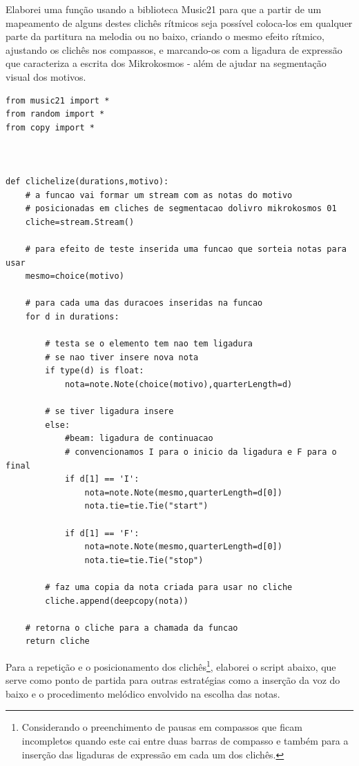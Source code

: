 \documentclass[
	12pt,				%
	openright,			%
	twoside,			%
	a4paper,			%
	english,			%
	french,				%
	spanish,			%
	brazil				%
	]{abntex2}
\begin{document}
Elaborei uma função usando a biblioteca Music21 para que a partir de um mapeamento de alguns destes clichês rítmicos seja possível coloca-los em qualquer parte da partitura na melodia ou no baixo, criando o mesmo efeito rítmico, ajustando os clichês nos compassos, e marcando-os com a ligadura de expressão que caracteriza a escrita dos Mikrokosmos - além de ajudar na segmentação visual dos motivos.

\begin{lstlisting}
from music21 import *
from random import *
from copy import *



def clichelize(durations,motivo):
	# a funcao vai formar um stream com as notas do motivo
	# posicionadas em cliches de segmentacao dolivro mikrokosmos 01
	cliche=stream.Stream()

	# para efeito de teste inserida uma funcao que sorteia notas para usar
	mesmo=choice(motivo)

	# para cada uma das duracoes inseridas na funcao
	for d in durations:

		# testa se o elemento tem nao tem ligadura
		# se nao tiver insere nova nota
		if type(d) is float:	
			nota=note.Note(choice(motivo),quarterLength=d)

		# se tiver ligadura insere 
		else:	
			#beam: ligadura de continuacao
			# convencionamos I para o inicio da ligadura e F para o final
			if d[1] == 'I':
				nota=note.Note(mesmo,quarterLength=d[0])
				nota.tie=tie.Tie("start")
				
			if d[1] == 'F':
				nota=note.Note(mesmo,quarterLength=d[0])
				nota.tie=tie.Tie("stop")

		# faz uma copia da nota criada para usar no cliche
		cliche.append(deepcopy(nota))

	# retorna o cliche para a chamada da funcao
	return cliche

\end{lstlisting}

Para a repetição e o posicionamento dos clichês\footnote{Considerando o preenchimento de pausas em compassos que ficam incompletos quando este cai entre duas barras de compasso e também para a inserção das ligaduras de expressão em cada um dos clichês.}, elaborei o script abaixo, que serve como ponto de partida para outras estratégias como a inserção da voz do baixo e o procedimento melódico envolvido na escolha das notas.
\end{document}
